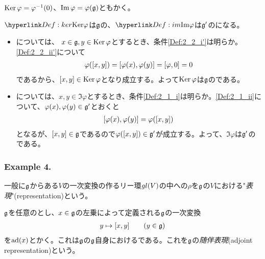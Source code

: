 \documentclass[fleqn,twocolumn,titlepage,dvipdfmx]{jsarticle}
\begin{document}
\begin{remark}
  $\operatorname{Ker}\varphi=\varphi^{-1}(0)$、$\Im\varphi=\varphi(\mathfrak{g})$ともかく。
\end{remark}

\begin{theorem}\label{thm:ker_im}
  $\hlin{Def:ker}{\Ker}\varphi$は$\mathfrak{g}$の{}、$\hlin{Def:im}{\Im}\varphi$は$\mathfrak{g}^{\prime}$の{}になる。
\end{theorem}

\begin{Proof}
  \begin{itemize}
    \item {}については、
      $x\in\mathfrak{g},y\in\operatorname{Ker}\varphi$とするとき、条件\ref{Def:2_2_i'}は明らか。\ref{Def:2_2_ii'}について
      \begin{align*}
        \varphi\qty(\comm{x}{y}) = \comm{\varphi(x)}{\varphi(y)}=\comm{\varphi}{0}=0
      \end{align*}
      であるから、$\comm{x}{y}\in\Ker\varphi$となり成立する。よって$\operatorname{Ker}\varphi$は$\mathfrak{g}$の{}である。
    \item {}については、$x,y\in\Im\varphi$とするとき、条件\ref{Def:2_1_i}は明らか。\ref{Def:2_1_ii}について、$\varphi(x),\varphi(y)\in\mathfrak{g}^{\prime}$とおくと
      \begin{align*}
        \comm{\varphi(x)}{\varphi(y)} = \varphi\qty(\comm{x}{y})
      \end{align*}
      となるが、$\comm{x}{y}\in\g$であるので$\varphi\qty(\comm{x}{y})\in\g^{\prime}$が成立する。よって、$\Im\varphi$は$\mathfrak{g}^{\prime}$の{}である。
  \end{itemize}
\end{Proof}

\subsubsection*{Example 4.}
\begin{definition}[表現]\label{Def:rep}
  一般に{}$\mathfrak{g}$からある$V$の一次変換の作るリー環$gl(V)$の中への{}$\rho$を$\mathfrak{g}$の$V$における"\emph{表現}"(representation)という。
\end{definition}

\begin{definition}[随伴表現]\label{Def:adj_rep}
  $\mathfrak{g}$を任意の{}とし、$x\in\mathfrak{g}$の左乗によって定義される$\mathfrak{g}$の一次変換
  \begin{align*}
    y\mapsto\comm{x}{y}\qq{}(y\in\g)
  \end{align*}
  を$\operatorname{ad}(x)$とかく。これは$\mathfrak{g}$の$\mathfrak{g}$自身における{}である。これを$\mathfrak{g}$の\emph{随伴表現}(adjoint representation)という。
\end{definition}
\end{document}

